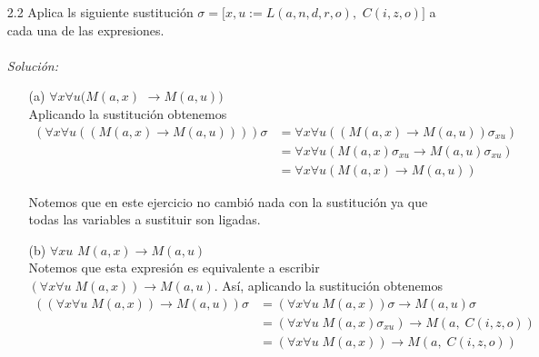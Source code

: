 \documentclass[letterpaper,11pt]{article}
\begin{document}
\begin{enumerate}
\begin{itemize}
\begin{enumerate}
                \item[2.2] Aplica ls siguiente sustitución 
                $\sigma = [x, u := L(a,n,d,r,o),$ $C(i,z,o)]$ a cada una 
                de las expresiones. \\ \\
                \textit{Solución:}
                \begin{itemize}
                    \item[(a)] $\forall x \forall u (M(a,x)$ 
                    $\rightarrow M(a,u))$ \\
                    Aplicando la sustitución obtenemos 
                    \begin{align*}
                        (\forall x \forall u ((M(a,x) 
                        \rightarrow M(a,u)))) \sigma
                        &= \forall x \forall u ((M(a,x) 
                        \rightarrow M(a,u)) \sigma_{xu}) \\
                        &= \forall x \forall u (M(a,x) \sigma_{xu} 
                        \rightarrow M(a,u) \sigma_{xu}) \\
                        &= \forall x \forall u (M(a,x) \rightarrow M(a,u))
                    \end{align*}

                    Notemos que en este ejercicio no cambió nada con la 
                    sustitución ya que todas las variables a sustituir son 
                    ligadas. 

                    \item[(b)] $\forall xu$ $M(a,x) \rightarrow M(a,u)$ \\
                    Notemos que esta expresión es equivalente a escribir 
                    $(\forall x \forall u \; M(a,x)) \rightarrow M(a,u)$. Así,
                    aplicando la sustitución obtenemos 
                    \begin{align*}
                        ((\forall x \forall u \; M(a,x)) 
                        \rightarrow M(a,u)) \sigma
                        &= (\forall x \forall u \; M(a,x)) \sigma
                        \rightarrow M(a,u) \sigma \\
                        &= (\forall x \forall u \; M(a,x) \sigma_{xu})
                        \rightarrow M(a, \; C(i,z,o)) \\
                        &= (\forall x \forall u \; M(a,x))
                        \rightarrow M(a, \; C(i,z,o))
                    \end{align*}


\end{itemize}
\end{enumerate}
\end{itemize}
\end{enumerate}
\end{document}
